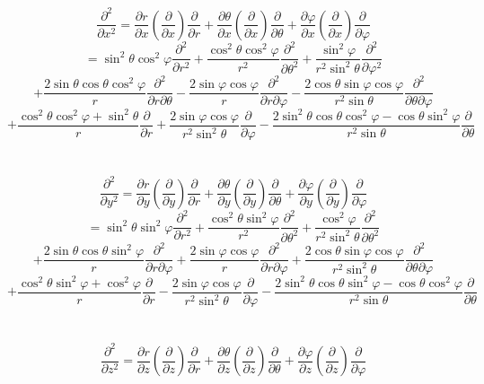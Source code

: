 \documentclass[10.5pt]{article}
\begin{document}
$$\frac{\partial ^2}{\partial x^2} = \frac{\partial r}{\partial x}(\frac{\partial }{\partial x})\frac{\partial }{\partial r} + \frac{\partial \theta }{\partial x}(\frac{\partial }{\partial x})\frac{\partial }{\partial \theta } + \frac{\partial \varphi }{\partial x}(\frac{\partial}{\partial x})\frac{\partial}{\partial \varphi } $$
$$ = \sin^2 \theta \cos^2 \varphi \frac{\partial^2}{\partial r^2} + \frac{\cos^2\theta \cos^2\varphi }{r^2}\frac{\partial^2}{\partial \theta^2} + \frac{\sin^2 \varphi}{r^2\sin^2\theta}\frac{\partial^2}{\partial \varphi^2}$$
$$ + \frac{2\sin \theta \cos \theta \cos^2\varphi }{r}\frac{\partial^2}{\partial r \partial \theta } - \frac{2\sin \varphi \cos \varphi}{r}\frac{\partial^2}{\partial r \partial \varphi} - \frac{2\cos \theta \sin \varphi \cos \varphi}{r^2\sin \theta}\frac{\partial^2}{\partial \theta \partial \varphi}$$
$$ + \frac{\cos^2\theta \cos^2\varphi + \sin^2\theta}{r}\frac{\partial}{\partial r} + \frac{2\sin\varphi \cos\varphi}{r^2\sin^2\theta }\frac{\partial}{\partial \varphi} - \frac{2\sin^2\theta \cos\theta \cos^2\varphi - \cos\theta \sin^2\varphi }{r^2\sin\theta}\frac{\partial }{\partial \theta}$$
\\\\
$$\frac{\partial^2}{\partial y^2} = \frac{\partial r}{\partial y}(\frac{\partial }{\partial y})\frac{\partial }{\partial r} + \frac{\partial \theta }{\partial y}(\frac{\partial }{\partial y})\frac{\partial }{\partial \theta } + \frac{\partial \varphi }{\partial y}(\frac{\partial}{\partial y})\frac{\partial}{\partial \varphi }$$
$$ = \sin^2\theta \sin^2\varphi \frac{\partial^2}{\partial r^2} + \frac{\cos^2\theta \sin^2\varphi }{r^2}\frac{\partial^2}{\partial \theta^2} + \frac{\cos^2\varphi}{r^2\sin^2\theta}\frac{\partial^2}{\partial \theta^2}$$
$$ + \frac{2\sin\theta \cos\theta \sin^2\varphi}{r}\frac{\partial^2}{\partial r \partial\varphi} + \frac{2\sin\varphi \cos\varphi }{r}\frac{\partial^2}{\partial r \partial\varphi } + \frac{2\cos\theta \sin\varphi \cos\varphi }{r^2\sin^2\theta }\frac{\partial^2}{\partial\theta \partial\varphi}$$
$$ + \frac{\cos^2\theta \sin^2\varphi + \cos^2\varphi }{r}\frac{\partial}{\partial r} - \frac{2\sin\varphi \cos\varphi}{r^2\sin^2\theta }\frac{\partial }{\partial \varphi} - \frac{2\sin^2\theta \cos\theta \sin^2\varphi - \cos\theta \cos^2\varphi }{r^2\sin\theta }\frac{\partial }{\partial\theta}$$
\\\\
$$\frac{\partial^2}{\partial z^2} = \frac{\partial r}{\partial z}(\frac{\partial }{\partial z})\frac{\partial }{\partial r} + \frac{\partial \theta }{\partial z}(\frac{\partial }{\partial z})\frac{\partial }{\partial \theta } + \frac{\partial \varphi }{\partial z}(\frac{\partial}{\partial z})\frac{\partial}{\partial \varphi }$$
\end{document}
